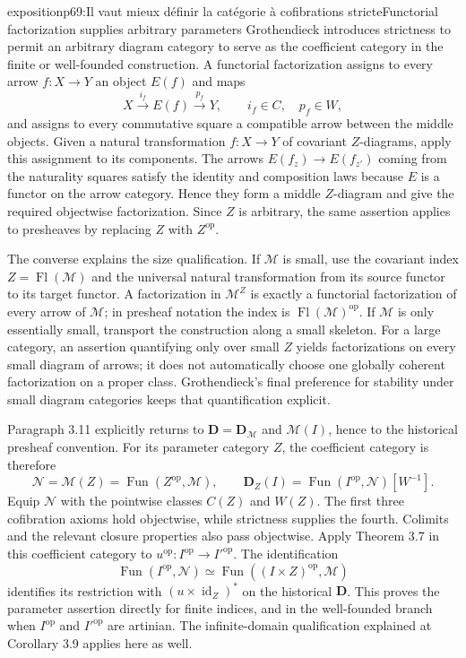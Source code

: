 \begin{dcomment}{exposition}{p69:Il vaut mieux définir la catégorie à cofibrations stricte}{Functorial factorization supplies arbitrary parameters}
Grothendieck introduces strictness to permit an arbitrary diagram category to serve as the coefficient category in the finite or well-founded construction. A functorial factorization assigns to every arrow $f:X\to Y$ an object $E(f)$ and maps
\[
 X\xrightarrow{i_f}E(f)\xrightarrow{p_f}Y,
 \qquad i_f\in C,\quad p_f\in W,
\]
and assigns to every commutative square a compatible arrow between the middle objects. Given a natural transformation $f:X\to Y$ of covariant $Z$-diagrams, apply this assignment to its components. The arrows $E(f_z)\to E(f_{z'})$ coming from the naturality squares satisfy the identity and composition laws because $E$ is a functor on the arrow category. Hence they form a middle $Z$-diagram and give the required objectwise factorization. Since $Z$ is arbitrary, the same assertion applies to presheaves by replacing $Z$ with $Z^{\mathrm{op}}$.

The converse explains the size qualification. If $\mathcal M$ is small, use the covariant index $Z=\operatorname{Fl}(\mathcal M)$ and the universal natural transformation from its source functor to its target functor. A factorization in $\mathcal M^Z$ is exactly a functorial factorization of every arrow of $\mathcal M$; in presheaf notation the index is $\operatorname{Fl}(\mathcal M)^{\mathrm{op}}$. If $\mathcal M$ is only essentially small, transport the construction along a small skeleton. For a large category, an assertion quantifying only over small $Z$ yields factorizations on every small diagram of arrows; it does not automatically choose one globally coherent factorization on a proper class. Grothendieck's final preference for stability under small diagram categories keeps that quantification explicit.

Paragraph 3.11 explicitly returns to $\mathbf D=\mathbf D_{\mathcal M}$ and $\mathcal M(I)$, hence to the historical presheaf convention. For its parameter category $Z$, the coefficient category is therefore
\[
 \mathcal N=\mathcal M(Z)=\operatorname{Fun}(Z^{\mathrm{op}},\mathcal M),
 \qquad
 \mathbf D_Z(I)=\operatorname{Fun}(I^{\mathrm{op}},\mathcal N)[W^{-1}].
\]
Equip $\mathcal N$ with the pointwise classes $C(Z)$ and $W(Z)$. The first three cofibration axioms hold objectwise, while strictness supplies the fourth. Colimits and the relevant closure properties also pass objectwise. Apply Theorem 3.7 in this coefficient category to $u^{\mathrm{op}}:I^{\mathrm{op}}\to I'^{\mathrm{op}}$. The identification
\[
 \operatorname{Fun}(I^{\mathrm{op}},\mathcal N)
 \simeq \operatorname{Fun}((I\times Z)^{\mathrm{op}},\mathcal M)
\]
identifies its restriction with $(u\times\operatorname{id}_Z)^*$ on the historical $\mathbf D$. This proves the parameter assertion directly for finite indices, and in the well-founded branch when $I^{\mathrm{op}}$ and $I'^{\mathrm{op}}$ are artinian. The infinite-domain qualification explained at Corollary 3.9 applies here as well.


\end{dcomment}
